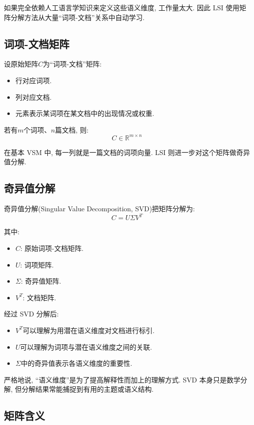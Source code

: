如果完全依赖人工语言学知识来定义这些语义维度, 工作量太大.
因此 LSI 使用矩阵分解方法从大量“词项-文档”关系中自动学习.

\subsection{词项-文档矩阵}


设原始矩阵$C$为“词项-文档”矩阵:

\begin{itemize}
\item 行对应词项.
\item 列对应文档.
\item 元素表示某词项在某文档中的出现情况或权重.
\end{itemize}

若有$m$个词项、$n$篇文档, 则:
\[
C \in \mathbb{R}^{m \times n}
\]

在基本 VSM 中, 每一列就是一篇文档的词项向量.
LSI 则进一步对这个矩阵做奇异值分解.

\subsection{奇异值分解}


奇异值分解(Singular Value Decomposition, SVD)把矩阵分解为:
\[
C = U \Sigma V^T
\]

其中:

\begin{itemize}
\item $C$: 原始词项-文档矩阵.
\item $U$: 词项矩阵.
\item $\Sigma$: 奇异值矩阵.
\item $V^T$: 文档矩阵.
\end{itemize}

经过 SVD 分解后:

\begin{itemize}
\item $V^T$可以理解为用潜在语义维度对文档进行标引.
\item $U$可以理解为词项与潜在语义维度之间的关联.
\item $\Sigma$中的奇异值表示各语义维度的重要性.
\end{itemize}

严格地说, “语义维度”是为了提高解释性而加上的理解方式.
SVD 本身只是数学分解, 但分解结果常能捕捉到有用的主题或语义结构.

\subsection{矩阵含义}


